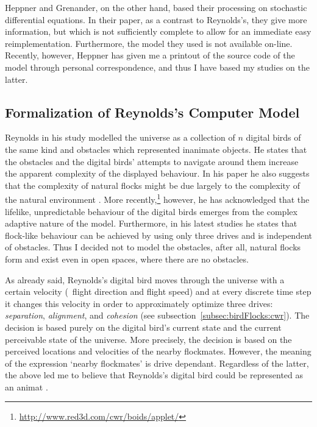 Heppner and Grenander, on the other hand, based their processing on stochastic differential equations. In their paper, as a contrast to Reynolds's, they give more information, but which is not sufficiently complete to allow for an immediate easy reimplementation. Furthermore, the model they used is not available on-line. Recently, however, Heppner has given me a printout of the source code of the model through personal correspondence, and thus I have based my studies on the latter. 

\subsection{Formalization of Reynolds's Computer Model}
\label{subsec:animat:cwr}
Reynolds in his study \cite{reynolds:1987} modelled the universe as a collection of $n$ digital birds of the same kind and obstacles which represented inanimate objects. He states that the obstacles and the digital birds' attempts to navigate around them increase the apparent complexity of the displayed behaviour. In his paper he also suggests that the complexity of natural flocks might be due largely to the complexity of the natural environment \cite{reynolds:1987}. More recently,\footnote{\href{http://www.red3d.com/cwr/boids/applet/}{http://www.red3d.com/cwr/boids/applet/}} however, he has acknowledged that the lifelike, unpredictable behaviour of the digital birds emerges from the complex adaptive nature of the model. Furthermore, in his latest studies \cite{reynolds:1999,reynolds:2000} he states that flock-like behaviour can be achieved by using only three drives and is independent of obstacles. Thus I decided not to model the obstacles, after all, natural flocks form and exist even in open spaces, where there are no obstacles.

As already said, Reynolds's digital bird moves through the universe with a certain velocity (\ie\ flight direction and flight speed) and at every discrete time step it changes this velocity in order to approximately optimize three drives: \emph{separation}, \emph{alignment}, and \emph{cohesion} (see subsection~\ref{subsec:birdFlocks:cwr}). The decision is based purely on the digital bird's current state and the current perceivable state of the universe. More precisely, the decision is based on the perceived locations and velocities of the nearby flockmates. However, the meaning of the expression `nearby flockmates' is drive dependant. Regardless of the latter, the above led me to believe that Reynolds's digital bird could be represented as an animat \cite{lebar_bajec:2002,lebar_bajec:2003a,lebar_bajec:2003b}.

